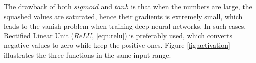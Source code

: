 The drawback of both $sigmoid$ and $tanh$ is that when the numbers are large, the squashed values are saturated, hence their gradients is extremely small, which leads to the vanish problem when training deep neural networks. In such cases, Rectified Linear Unit ($ReLU$, \ref{eqn:relu}) is preferably used, which converts negative values to zero while keep the positive ones.
Figure \ref{fig:activation} illustrates the three functions in the same input range.


